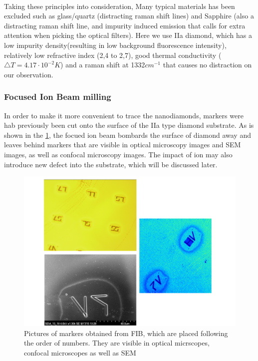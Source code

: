 \paragraph{}Taking these principles into consideration, Many typical materials has been excluded such as glass/quartz (distracting raman shift lines) and Sapphire (also a distracting raman shift line, and impurity induced emission that calls for extra attention when picking the optical filters). Here we use IIa diamond, which has a low impurity density(resulting in low background fluorescence intensity), relatively low refractive index (2,4 to 2,7), good thermal conductivity ($\bigtriangleup T = 4.17 \cdot 10^{-2}K$) and a raman shift at 1332$cm^{-1} $ that causes no distraction on our observation.

\subsubsection{Focused Ion Beam milling}
In order to make it more convenient to trace the nanodiamonds, markers were hab previously been cut onto the surface of the IIa type diamond substrate.\cite{jantzen_low_2015} As is shown in the \ref{fig:20150907sample214spincoated5}, the focued ion beam bombards the surface of diamond away and leaves behind markers that are visible in optical microscopy images and SEM images, as well as confocal microscopy images. The impact of ion may also introduce new defect into the substrate, which will be discussed later.
\FloatBarrier
\begin{figure}[h]
\centering
\includegraphics[width=1\linewidth]{Figures/pic/fib}
\caption{Pictures of markers obtained from FIB, which are placed following the order of numbers. They are visible in optical micrscopes, confocal microscopes as well as SEM   }
\label{fig:20150907sample214spincoated5}
\end{figure}
\FloatBarrier

